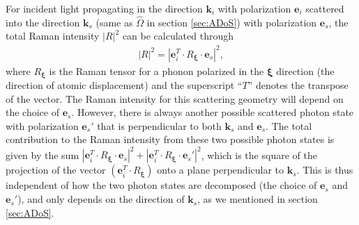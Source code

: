 \documentclass[%
 reprint,
superscriptaddress,
 amsmath,amssymb,
 aps,
pra,
]{revtex4-1}
\newcommand{\mb}[1]{\mathbf{#1}} %
\begin{document}
For incident light propagating in the direction $\mb{k}_i$ with polarization $\mb{e}_i$ scattered into the direction $\mb{k}_s$ (same as $\hat{\Omega}$ in section \ref{sec:ADoS}) with polarization $\mb{e}_s$, the total Raman intensity $|R|^2$ can be calculated through \cite{yu1996fundamentals}
\begin{align}\label{eq:RI}
|R|^2=|\mb{e}_i^T\cdot R_{\boldsymbol{\xi}} \cdot \mb{e}_s|^2,
\end{align}
where $R_{\boldsymbol{\xi}}$ is the Raman tensor for a phonon polarized in the $\boldsymbol{\xi}$ direction (the direction of atomic displacement) and the superscript ``$T$'' denotes the transpose of the vector. The Raman intensity for this scattering geometry will depend on the choice of $\mb{e}_s$. However, there is always another possible scattered photon state with polarization $\mb{e}_s'$ that is perpendicular to both $\mb{k}_s$ and $\mb{e}_s$. The total contribution to the Raman intensity from these two possible photon states is given by the sum $|\mb{e}_i^T\cdot R_{\boldsymbol{\xi}} \cdot \mb{e}_s|^2+|\mb{e}_i^T\cdot R_{\boldsymbol{\xi}} \cdot \mb{e}_s'|^2$, which is the square of the projection of the vector $(\mb{e}_i^T\cdot R_{\boldsymbol{\xi}})$ onto a plane perpendicular to $\mb{k}_s$. This is thus independent of how the two photon states are decomposed (the choice of $\mb{e}_s$ and $\mb{e}_s'$), and only depends on the direction of $\mb{k}_s$, as we mentioned in section \ref{sec:ADoS}. 
\end{document}
